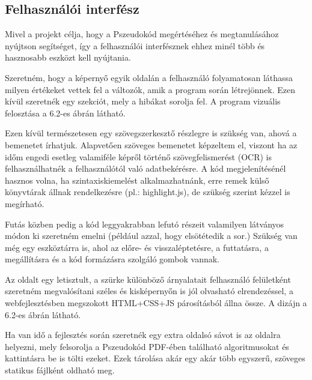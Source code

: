\subsection{Felhasználói interfész}

Mivel a projekt célja, hogy a Pszeudokód megértéséhez és megtanulásához nyújtson segítséget, így a felhasználói interfésznek ehhez minél több és hasznosabb eszközt kell nyújtania.

Szeretném, hogy a képernyő egyik oldalán a felhasználó folyamatosan láthassa milyen értékeket vettek fel a változók, amik a program során létrejönnek. Ezen kívül szeretnék egy szekciót, mely a hibákat sorolja fel. A program vizuális felosztása a 6.2-es ábrán látható.

Ezen kívül természetesen egy szövegszerkesztő részlegre is szükség van, ahová a bemenetet írhatjuk. Alapvetően szöveges bemenetet képzeltem el, viszont ha az időm engedi esetleg valamiféle képről történő szövegfelismerést (OCR) is felhasználhatnék a felhasználótól való adatbekérésre. A kód megjelenítésénél hasznos volna, ha szintaxiskiemelést alkalmazhatnánk, erre remek külső könyvtárak állnak rendelkezésre (pl.: highlight.js), de szükség szerint kézzel is megírható.

Futás közben pedig a kód leggyakrabban lefutó részeit valamilyen látványos módon ki szeretném emelni (például azzal, hogy elsötétedik a sor.) Szükség van még egy eszköztárra is, ahol az előre- és visszaléptetésre, a futtatásra, a megállításra és a kód formázásra szolgáló gombok vannak.

Az oldalt egy letisztult, a szürke különböző árnyalatait felhasználó felületként szeretném megvalósítani széles és kisképernyőn is jól olvasható elrendezéssel, a webfejlesztésben megszokott HTML+CSS+JS párosításból állna össze. A dizájn a 6.2-es ábrán látható.

Ha van idő a fejlesztés során szeretnék egy extra oldalsó sávot is az oldalra helyezni, mely felsorolja a Pszeudokód PDF-ében található algoritmusokat és kattintásra be is tölti ezeket. Ezek tárolása akár egy akár több egyszerű, szöveges statikus fájlként oldható meg.